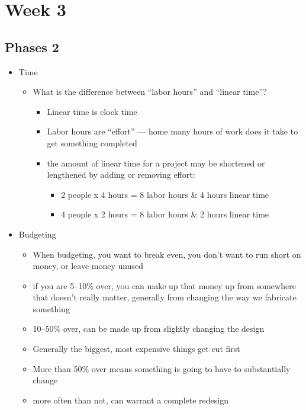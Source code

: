 \documentclass[12pt]{article}
\begin{document}
    \section{Week 3}
        \subsection{Phases 2}
            \begin{itemize}
                \item Time
                \begin{itemize}
                    \item What is the difference between ``labor hours'' and ``linear time''?
                    \begin{itemize}
                        \item Linear time is clock time
                        \item Labor hours are ``effort'' --- home many hours of work does it take to get something completed
                        \item the amount of linear time for a project may be shortened or lengthened by adding or removing effort:
                        \begin{itemize}
                            \item 2 people x 4 hours = 8 labor hours \& 4 hours linear time
                            \item 4 people x 2 hours = 8 labor hours \& 2 hours linear time
                        \end{itemize}
                    \end{itemize}
                \end{itemize}
                \item Budgeting
                \begin{itemize}
                    \item When budgeting, you want to break even, you don't want to run short on money, or leave money unused
                    \item if you are 5--10\% over, you can make up that money up from somewhere that doesn't really matter, generally from changing the way we fabricate something
                    \item 10--50\% over, can be made up from slightly changing the design
                    \item Generally the biggest, most expensive things get cut first
                    \item More than 50\% over means something is going to have to substantially change
                    \item more often than not, can warrant a complete redesign
                \end{itemize}
            \end{itemize}
            \newpage
\end{document}
